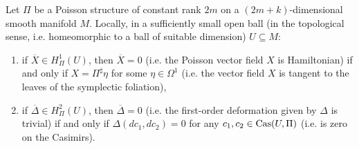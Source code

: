 \documentclass[main.tex]{subfiles}
\begin{document}
\begin{lemma}
\label{lemma:poisson_cohomology_is_loc_trivial}
	Let $\Pi$ be a Poisson structure of constant rank $2m$ on a $(2m+k)$-dimensional smooth manifold $M$. Locally, in a sufficiently small open ball (in the topological sense, i.e. homeomorphic to a ball of suitable dimension) $U \subseteq M$:
	\begin{enumerate}
		\item if $\overline X \in H^1_\Pi(U)$, then $\overline X = 0$ (i.e. the Poisson vector field $X$ is Hamiltonian) if and only if $X = \Pi^\sharp \eta$ for some $\eta \in \Omega^1$ (i.e. the vector field $X$ is tangent to the leaves of the symplectic foliation),
		\item if $\overline\Delta \in H^2_\Pi(U)$, then $\overline\Delta =0$ (i.e. the first-order deformation given by $\Delta$ is trivial) if and only if $\Delta(dc_1, dc_2)=0$ for any $c_1, c_2 \in \mathrm{Cas}(U, \Pi)$ (i.e. is zero on the Casimirs).
	\end{enumerate}
\end{lemma}
\end{document}
